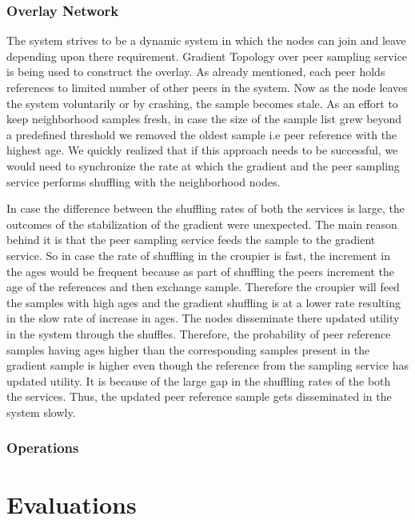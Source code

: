 \documentclass[12pt,a4paper,twoside,openright]{book}
\begin{document}
\subsection{Overlay Network}
The system strives to be a dynamic system in which the nodes can join and leave depending upon there requirement. Gradient Topology over peer sampling service is being used to construct the overlay. As already mentioned, each peer holds references to limited number of other peers in the system. Now as the node leaves the system voluntarily or by crashing, the sample becomes stale. As an effort to keep neighborhood samples fresh, in case the size of the sample list grew beyond a predefined threshold we removed the oldest sample i.e peer reference with the highest age. We quickly realized that if this approach needs to be successful, we would need to synchronize the rate at which the gradient and the peer sampling service performs shuffling with the neighborhood nodes.
\par In case the difference between the shuffling rates of both the services is large, the outcomes of the stabilization of the gradient were unexpected. The main reason behind it is that the peer sampling service feeds the sample to the gradient service. So in case the rate of shuffling in the croupier is fast, the increment in the ages would be frequent because as part of shuffling the peers increment the age of the references and then exchange sample. Therefore the croupier will feed the samples with high ages and the gradient shuffling is at a lower rate resulting in the slow rate of increase in ages. The nodes disseminate there updated utility in the system through the shuffles. Therefore, the probability of peer reference samples having ages higher than the corresponding samples present in the gradient sample is higher even though the reference from the sampling service has updated utility. It is because of the large gap in the shuffling rates of the both the services. Thus, the updated peer reference sample gets disseminated in the system slowly.

\subsection{Operations}



\chapter{Evaluations}
\label{sec:eval}
\end{document}
